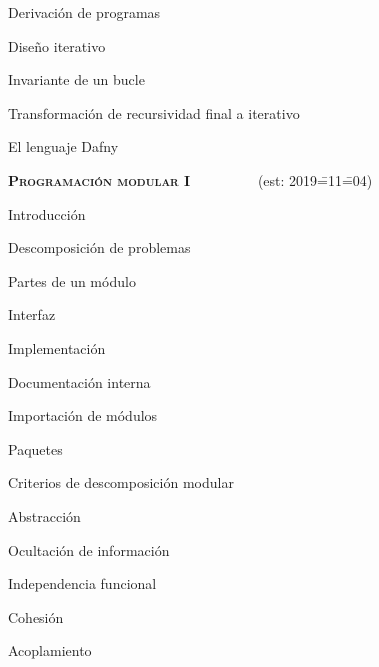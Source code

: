 \begin{longenum}
\begin{longenum}
\begin{longenum}
\begin{longenum}
            \end{longenum}
            \item Derivación de programas
            \begin{longenum}
                \item Diseño iterativo
                \begin{longenum}
                    \item Invariante de un bucle
                    \item Transformación de recursividad final a iterativo
                \end{longenum}
            \end{longenum}
        \end{longenum}
        \item El lenguaje Dafny \opcional\
    \end{longenum}
    \item \textbf{\textsc{Programación modular I}} \ \ \ \ \ \ \ \ \ (est: 2019\==11\==04)
    \begin{longenum}
        \item Introducción
        \begin{longenum}
            \item Descomposición de problemas
        \end{longenum}
        \item Partes de un módulo
        \begin{longenum}
            \item Interfaz
            \item Implementación
            \item Documentación interna
        \end{longenum}
        \item Importación de módulos
        \item Paquetes
        \item Criterios de descomposición modular
        \begin{longenum}
            \item Abstracción
            \item Ocultación de información
            \item Independencia funcional
            \begin{longenum}
                \item Cohesión
                \item Acoplamiento

\end{longenum}
\end{longenum}
\end{longenum}
\end{longenum}
